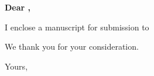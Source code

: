 \documentclass[a4paper]{letter}
\begin{document}



\begin{letter}{} %


	\opening{\textbf{Dear ,}}
 
I enclose a manuscript for submission to

We thank you for your consideration.

\vspace{\parskip} %
\closing{Yours,}
\vspace{2\parskip} %




\end{letter}
 
\end{document}
